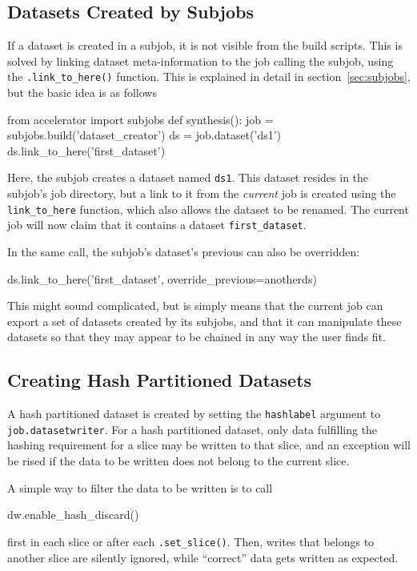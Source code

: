 \subsection{Datasets Created by Subjobs}
If a dataset is created in a subjob, it is not visible from the build
scripts.  This is solved by linking dataset meta-information to the
job calling the subjob, using the \texttt{.link\_to\_here()} function.
This is explained in detail in section~\ref{sec:subjobs}, but the
basic idea is as follows
\begin{python}
from accelerator import subjobs
def synthesis():
    job = subjobs.build('dataset_creator')
    ds = job.dataset('ds1')
    ds.link_to_here('first_dataset')
\end{python}
Here, the subjob creates a dataset named \texttt{ds1}.  This dataset
resides in the subjob's job directory, but a link to it from
the \textsl{current} job is created using the \texttt{link\_to\_here}
function, which also allows the dataset to be renamed.  The current
job will now claim that it contains a dataset \texttt{first\_dataset}.

In the same call, the subjob's dataset's previous can also be
overridden:
\begin{python}
ds.link_to_here('first_dataset', override_previous=anotherds)
\end{python}
This might sound complicated, but is simply means that the current job
can export a set of datasets created by its subjobs, and that it can
manipulate these datasets so that they may appear to be chained in any
way the user finds fit.



\subsection{Creating Hash Partitioned Datasets}
A hash partitioned dataset is created by setting
the \texttt{hashlabel} argument to \texttt{job.datasetwriter}.  For a
hash partitioned dataset, only data fulfilling the hashing requirement
for a slice may be written to that slice, and an exception will be
rised if the data to be written does not belong to the current slice.

A simple way to filter the data to be written is to call
\begin{python}
dw.enable_hash_discard()
\end{python}
first in each slice or after each \texttt{.set\_slice()}.  Then,
writes that belongs to another slice are silently ignored, while
``correct'' data gets written as expected.

